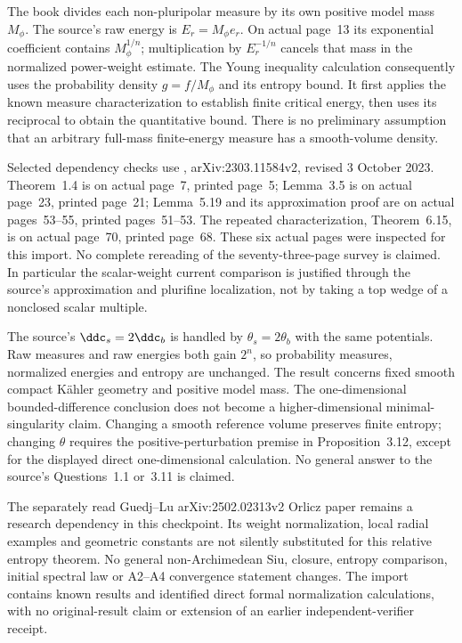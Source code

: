 The book divides each non-pluripolar measure by its own positive
model mass $M_\phi$. The source's raw energy is
$E_r=M_\phi e_r$. On actual page~13 its exponential coefficient
contains $M_\phi^{1/n}$; multiplication by $E_r^{-1/n}$ cancels
that mass in the normalized power-weight estimate. The Young
inequality calculation consequently uses the probability density
$g=f/M_\phi$ and its entropy bound. It first applies the known
measure characterization to establish finite critical energy,
then uses its reciprocal to obtain the quantitative bound.
There is no preliminary assumption that an arbitrary full-mass
finite-energy measure has a smooth-volume density.

Selected dependency checks use \cite{DDL23RelativeV2},
arXiv:2303.11584v2, revised 3 October 2023. Theorem~1.4 is on
actual page~7, printed page~5; Lemma~3.5 is on actual page~23,
printed page~21; Lemma~5.19 and its approximation proof are on
actual pages~53--55, printed pages~51--53. The repeated
characterization, Theorem~6.15, is on actual page~70, printed
page~68. These six actual pages were inspected for this import.
No complete rereading of the seventy-three-page survey is claimed.
In particular the scalar-weight current comparison is justified
through the source's approximation and plurifine localization,
not by taking a top wedge of a nonclosed scalar multiple.

The source's $\ddc_s=2\ddc_b$ is handled by
$\theta_s=2\theta_b$ with the same potentials. Raw measures
and raw energies both gain $2^n$, so probability measures,
normalized energies and entropy are unchanged. The result
concerns fixed smooth compact K\"ahler geometry and positive
model mass. The one-dimensional bounded-difference conclusion
does not become a higher-dimensional minimal-singularity claim.
Changing a smooth reference volume preserves finite entropy;
changing $\theta$ requires the positive-perturbation premise
in Proposition~3.12, except for the displayed direct
one-dimensional calculation. No general answer to the source's
Questions~1.1 or~3.11 is claimed.

The separately read Guedj--Lu arXiv:2502.02313v2 Orlicz paper
remains a research dependency in this checkpoint. Its weight
normalization, local radial examples and geometric constants
are not silently substituted for this relative entropy theorem.
No general non-Archimedean Siu, closure, entropy comparison,
initial spectral law or A2--A4 convergence statement changes.
The import contains known results and identified direct formal
normalization calculations, with no original-result claim or
extension of an earlier independent-verifier receipt.

